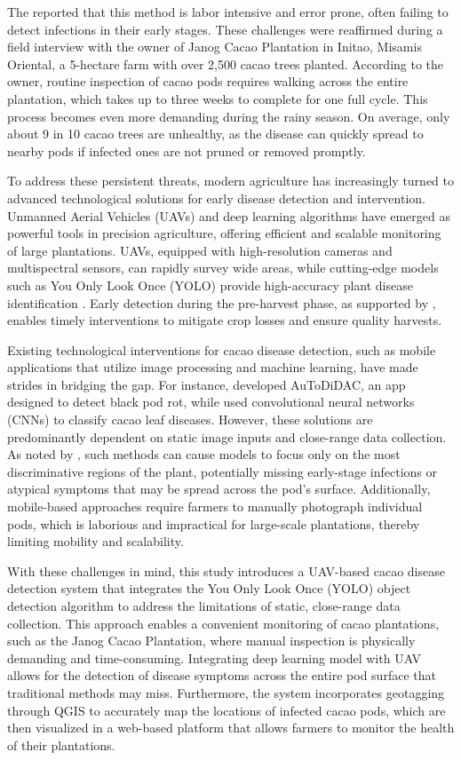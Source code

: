 {The \cite{PhilCacaoRoadmap2021} reported that this method is labor intensive and error prone, often failing to detect infections in their early stages. These challenges were reaffirmed during a field interview with the owner of Janog Cacao Plantation in Initao, Misamis Oriental, a 5-hectare farm with over 2,500 cacao trees planted. According to the owner, routine inspection of cacao pods requires walking across the entire plantation, which takes up to three weeks to complete for one full cycle. This process becomes even more demanding during the rainy season. On average, only about 9 in 10 cacao trees are unhealthy, as the disease can quickly spread to nearby pods if infected ones are not pruned or removed promptly. 

To address these persistent threats, modern agriculture has increasingly turned to advanced technological solutions for early disease detection and intervention. Unmanned Aerial Vehicles (UAVs) and deep learning algorithms have emerged as powerful tools in precision agriculture, offering efficient and scalable monitoring of large plantations. UAVs, equipped with high-resolution cameras and multispectral sensors, can rapidly survey wide areas, while cutting-edge models such as You Only Look Once (YOLO) provide high-accuracy plant disease identification \citep{Vyas2023}. Early detection during the pre-harvest phase, as supported by \cite{Upadhyay2025,Yadav2024}, enables timely interventions to mitigate crop losses and ensure quality harvests.

Existing technological interventions for cacao disease detection, such as mobile applications that utilize image processing and machine learning, have made strides in bridging the gap. For instance, \cite{Tan2018} developed AuToDiDAC, an app designed to detect black pod rot, while \cite{Tovurawa2025} used convolutional neural networks (CNNs) to classify cacao leaf diseases. However, these solutions are predominantly dependent on static image inputs and close-range data collection. As noted by \cite{Taesiri2023}, such methods can cause models to focus only on the most discriminative regions of the plant, potentially missing early-stage infections or atypical symptoms that may be spread across the pod’s surface. Additionally, mobile-based approaches require farmers to manually photograph individual pods, which is laborious and impractical for large-scale plantations, thereby limiting mobility and scalability.

With these challenges in mind, this study introduces a UAV-based cacao disease detection system that integrates the You Only Look Once (YOLO) object detection algorithm to address the limitations of static, close-range data collection. This approach enables a convenient monitoring of cacao plantations, such as the Janog Cacao Plantation, where manual inspection is physically demanding and time-consuming. Integrating deep learning model with UAV allows for the detection of disease symptoms across the entire pod surface that traditional methods may miss. Furthermore, the system incorporates geotagging through QGIS to accurately map the locations of infected cacao pods, which are then visualized in a web-based platform that allows farmers to monitor the health of their plantations.

}
